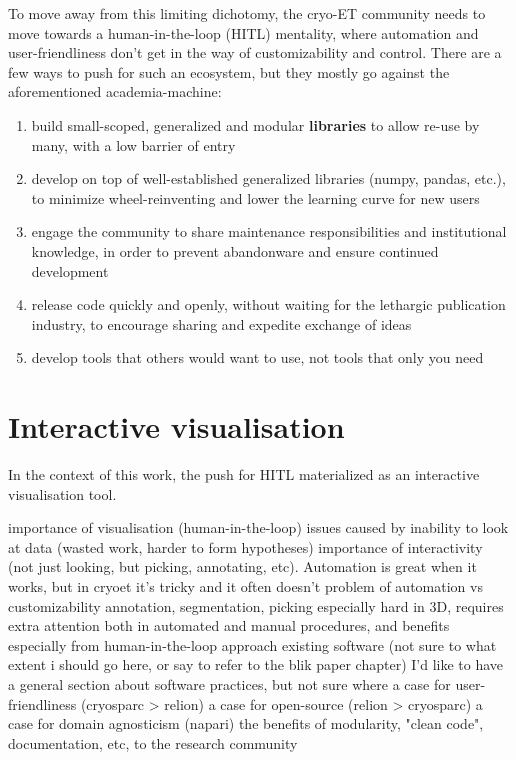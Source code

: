 To move away from this limiting dichotomy, the cryo-ET community needs to move towards a human-in-the-loop (HITL) mentality, where automation and user-friendliness don't get in the way of customizability and control.
There are a few ways to push for such an ecosystem, but they mostly go against the aforementioned academia-machine:

\begin{enumerate}[noitemsep]
    \item build small-scoped, generalized and modular \textbf{libraries} to allow re-use by many, with a low barrier of entry
    \item develop on top of well-established generalized libraries (numpy, pandas, etc.), to minimize wheel-reinventing and lower the learning curve for new users
    \item engage the community to share maintenance responsibilities and institutional knowledge, in order to prevent abandonware and ensure continued development
    \item release code quickly and openly, without waiting for the lethargic publication industry, to encourage sharing and expedite exchange of ideas
    \item develop tools that others would want to use, not tools that only you need
\end{enumerate}

\section{Interactive visualisation}

In the context of this work, the push for HITL materialized as an interactive visualisation tool.

\begin{outline}
\1 importance of visualisation (human-in-the-loop)
    \2 issues caused by inability to look at data (wasted work, harder to form hypotheses)
    \2 importance of interactivity (not just looking, but picking, annotating, etc). Automation is great when it works, but in cryoet it's tricky and it often doesn't
        \3 problem of automation vs customizability
\1 annotation, segmentation, picking
    \2 especially hard in 3D, requires extra attention both in automated and manual procedures, and benefits especially from human-in-the-loop approach
    \2 existing software (not sure to what extent i should go here, or say to refer to the blik paper chapter)
\1 I'd like to have a general section about software practices, but not sure where
    \2 a case for user-friendliness (cryosparc > relion)
    \2 a case for open-source (relion > cryosparc)
    \2 a case for domain agnosticism (napari)
    \2 the benefits of modularity, "clean code", documentation, etc, to the research community
\end{outline}


